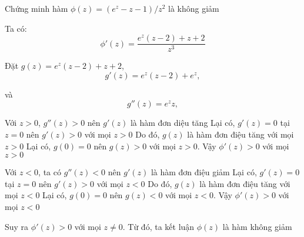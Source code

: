         

Chứng minh hàm $\phi(z) = (e^z - z - 1)/z^2$ là không giảm

Ta có:
\[
    \phi'(z) = \frac{e^z(z - 2) + z + 2}{z^3}
\]

Đặt $g(z) = e^z(z - 2) + z + 2$,
\[
    g'(z) = e^z(z - 2) + e^z,
\]

và 
\[
g''(z) = e^z z,
\]
      

Với $z > 0$, $g''(z) > 0$ nên $g'(z)$ là hàm đơn diệu tăng
Lại có, $g'(z) = 0$ tại $z = 0$ nên $g'(z) > 0$ với mọi $z > 0$
Do đó, $g(z)$ là hàm đơn điệu tăng với mọi $z > 0$
Lại có, $g(0) = 0$ nên $g(z) > 0$ với mọi $z > 0$. Vậy $\phi'(z) > 0$ với mọi $z > 0$

Với $z < 0$, ta có $g''(z) < 0$ nên $g'(z)$ là hàm đơn điệu giảm
Lại có, $g'(z) = 0$ tại $z = 0$ nên $g'(z) > 0$ với mọi $z < 0$
Do đó, $g(z)$ là hàm đơn điệu tăng với mọi $z < 0$
Lại có, $g(0) = 0$ nên $g(z) < 0$ với mọi $z < 0$. Vậy $\phi'(z) > 0$ với mọi $z < 0$

Suy ra $\phi'(z) > 0$ với mọi $z \neq 0$. Từ đó, ta kết luận $\phi(z)$ là hàm không giảm